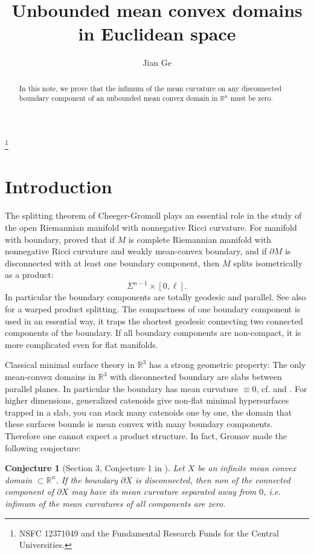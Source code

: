 \documentclass[reqno, 11pt]{amsart}
\theoremstyle{plain}
\newtheorem{conjecture}[conjecture]{Conjecture}
\theoremstyle{definition}
\theoremstyle{remark}
\numberwithin{equation}{section}
\begin{document}
\title{Unbounded mean convex domains in Euclidean space}
\author[J.~Ge]{Jian Ge}
\address[Ge]{School of Mathematical Sciences, Laboratory of Mathematics and Complex Systems, Beijing Normal University, Beijing 100875, P. R. China.}
\thanks{NSFC 12371049 and the Fundamental Research Funds for the Central Universities.}
\begin{abstract}
In this note, we prove that the infimum of the mean curvature on any disconnected boundary component of an unbounded mean convex domain in $\mathbb{R}^n$ must be zero.
\end{abstract}
\maketitle
\section{Introduction}
The splitting theorem of Cheeger-Gromoll plays an essential role in the study of the open Riemannian manifold with nonnegative Ricci curvature. For manifold with boundary, \cite{Kas1983} proved that if $M$ is complete Riemannian manifold with nonnegative Ricci curvature and weakly mean-convex boundary, and if $\partial M$ is disconnected with at least one boundary component, then $M$ splits isometrically as a product:
\begin{equation*}
	\Sigma^{n-1}\times [0, \ell].
\end{equation*}
In particular the boundary components are totally geodesic and parallel. See also \cite{CK1992} for a warped product splitting. The compactness of one boundary component is used in an essential way, it traps the shortest geodesic connecting two connected components of the boundary. If all boundary components are non-compact, it is more complicated even for flat manifolds. 

Classical minimal surface theory in $\mathbb{R}^{3}$ has a strong geometric property: The only mean-convex domains in $\mathbb{R}^{3}$ with disconnected boundary are slabs between parallel planes. In particular the boundary has mean curvature $\equiv  0$, cf. \cite{CS1980} and \cite{HM1990}. For higher dimensions, generalized catenoids give non-flat minimal hypersurfaces trapped in a slab, you can stack many catenoids one by one, the domain that these surfaces bounds is mean convex with many boundary components. Therefore one cannot expect a product structure. In fact, Gromov made the following conjecture:
\begin{conjecture}[Section 3, Conjecture 1 in \cite{Gro2019}]
	Let $X$ be an infinite mean convex domain $\subset \mathbb{R}^{n}$. If the boundary $\partial X$ is disconnected, then non of the connected component of $\partial X$ may have its mean curvature separated away from $0$, i.e. infimum of the mean curvatures of all components are zero.
\end{conjecture}
\end{document}
